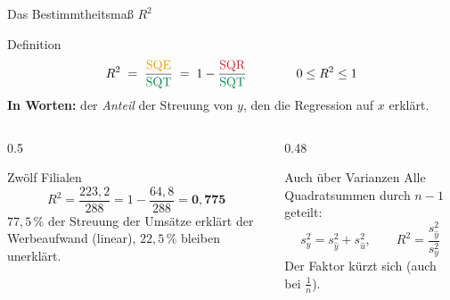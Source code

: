 \documentclass[aspectratio=169,11pt]{beamer}
\begin{document}
\begin{frame}{Das Bestimmtheitsmaß $R^{2}$}
  \begin{block}{Definition}
    \vspace{-1pt}
    \[
      R^{2}
      \;=\; \frac{\color{hsbiaccent}\text{SQE}}{\color{hsbigreen}\text{SQT}}
      \;=\; 1 - \frac{\color{resred}\text{SQR}}{\color{hsbigreen}\text{SQT}}
      \qquad\qquad 0 \le R^{2} \le 1
    \]
    \textbf{In Worten:} der \emph{Anteil} der Streuung von $y$, den die Regression
    auf $x$ erklärt.
  \end{block}

  \begin{columns}[T]
    \begin{column}{0.5\textwidth}
      \begin{exampleblock}{Zwölf Filialen}
        \[
          R^{2} = \frac{223{,}2}{288} = 1 - \frac{64{,}8}{288} = \mathbf{0{,}775}
        \]
        $77{,}5\,\%$ der Streuung der Umsätze erklärt der Werbeaufwand
        (linear), $22{,}5\,\%$ bleiben unerklärt.
      \end{exampleblock}
    \end{column}
    \begin{column}{0.48\textwidth}
      \begin{block}{Auch über Varianzen}
        Alle Quadratsummen durch $n - 1$ geteilt:
        \[
          s_y^{2} = s_{\hat{y}}^{2} + s_{\hat{u}}^{2},
          \qquad R^{2} = \frac{s_{\hat{y}}^{2}}{s_y^{2}}
        \]
        Der Faktor kürzt sich (auch bei $\frac{1}{n}$).
      \end{block}
    \end{column}
  \end{columns}
\end{frame}
\end{document}
